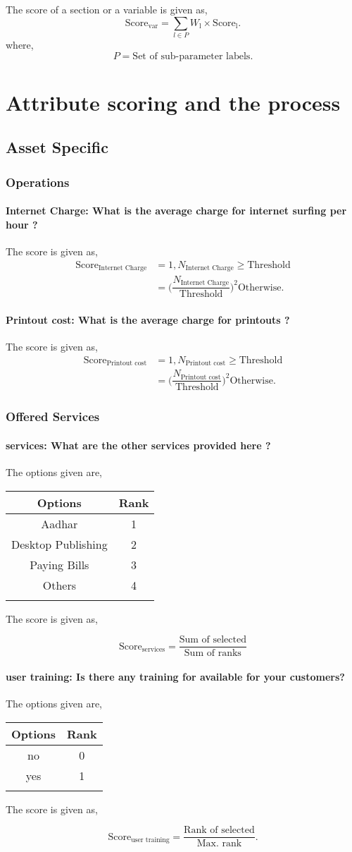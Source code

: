 \documentclass[oneside,twocolumn]{article}
\newcommand{\tsub}[2]{\text{#1}_{\text{#2}}}
\newcommand{\tsubb}[2]{#1_{\text{#2}}}
\newcommand{\dsub}[2]{\dfrac{\text{#1}}{\text{#2}}}
\newcommand{\multsel}[1]
{
	\[
		\tsub{Score}{#1} = \dsub{Sum of selected}{Sum of ranks}
	\]
}
\newcommand{\singsel}[1]
{
	\[
		\tsub{Score}{#1} = \dsub{Rank of selected}{Max. rank}.
	\]
}
\newenvironment{ttable}
{
\begin{center}
\begin{tabular}{c|c}
\hline
}
{
\\ \hline
\end{tabular}
\end{center}
}
\begin{document}
The score of a section or a variable is given as,
\[
	\tsub{Score}{var} = \sum_{l \in P} \tsubb{W}{l} \times \tsub{Score}{l}.
\]
where,
\[
	P = \text{Set of sub-parameter labels.}
\]
\section{Attribute scoring and the
process}
\subsection{Asset Specific}
\subsubsection{Operations}

\paragraph{Internet Charge: What is the average charge for internet surfing per hour ?}

The score is given as,
\begin{align*}
\tsub{Score}{Internet Charge} &= 1, \tsubb{N}{Internet Charge} \ge \text{Threshold} \\
        &=
\Big(\dfrac{\tsubb{N}{Internet Charge}}{\text{Threshold}}\Big)^{2}
\text{Otherwise}.
\end{align*}
\paragraph{Printout cost: What is the average charge for printouts ?}

The score is given as,
\begin{align*}
\tsub{Score}{Printout cost} &= 1, \tsubb{N}{Printout cost} \ge \text{Threshold} \\
        &=
\Big(\dfrac{\tsubb{N}{Printout cost}}{\text{Threshold}}\Big)^{2}
\text{Otherwise}.
\end{align*}
\subsubsection{Offered Services}

\paragraph{services: What are the other services provided here ?}

The options given are,
\begin{ttable}
Options & Rank \\ \hline
Aadhar & 1 \\
Desktop Publishing & 2 \\
Paying Bills & 3 \\
Others & 4 \\
\hline
\end{ttable}
The score is given as,
\multsel{services}
\paragraph{user training: Is there any training for available for your customers?}

The options given are,
\begin{ttable}
Options & Rank \\ \hline
no & 0 \\
yes & 1 \\
\hline
\end{ttable}
The score is given as,
\singsel{user training}
\end{document}
